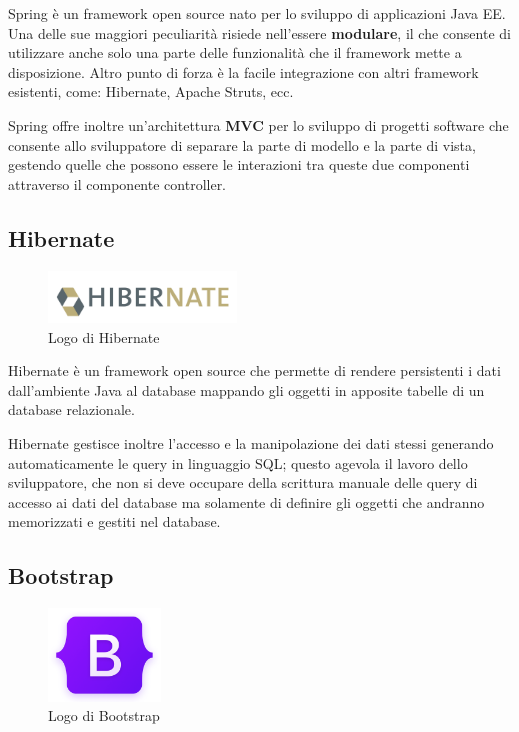 \noindent Spring è un framework open source nato per lo sviluppo di applicazioni Java EE. Una delle sue maggiori peculiarità risiede nell'essere \textbf{modulare}, il che consente di utilizzare anche solo una parte delle funzionalità che il framework mette a disposizione. Altro punto di forza è la facile integrazione con altri framework esistenti, come: Hibernate, Apache Struts, ecc. 

\setlength{\parskip}{3ex}

\noindent Spring offre inoltre un'architettura \textbf{MVC} per lo sviluppo di progetti software che consente allo sviluppatore di separare la parte di modello e la parte di vista, gestendo quelle che possono essere le interazioni tra queste due componenti attraverso il componente controller.

\subsection{Hibernate}

\begin{figure}[!h]
	\centering
	\includegraphics[width=5cm]{../images/Hibernate-logo.png}
	\caption{Logo di Hibernate}
\end{figure}

\noindent Hibernate è un framework open source che permette di  rendere persistenti i dati dall'ambiente Java al database mappando gli oggetti in apposite tabelle di un database relazionale.

\setlength{\parskip}{3ex}

\noindent Hibernate gestisce inoltre l'accesso e la manipolazione dei dati stessi generando automaticamente le query in linguaggio SQL; questo agevola il lavoro dello sviluppatore, che non si deve occupare della scrittura manuale delle query di accesso ai dati del database ma solamente di definire gli oggetti che andranno memorizzati e gestiti nel database.

\pagebreak

\subsection{Bootstrap}

\begin{figure}[!h]
	\centering
	\includegraphics[width=3cm]{../images/Bootstrap-logo.png}
	\caption{Logo di Bootstrap}
\end{figure}


